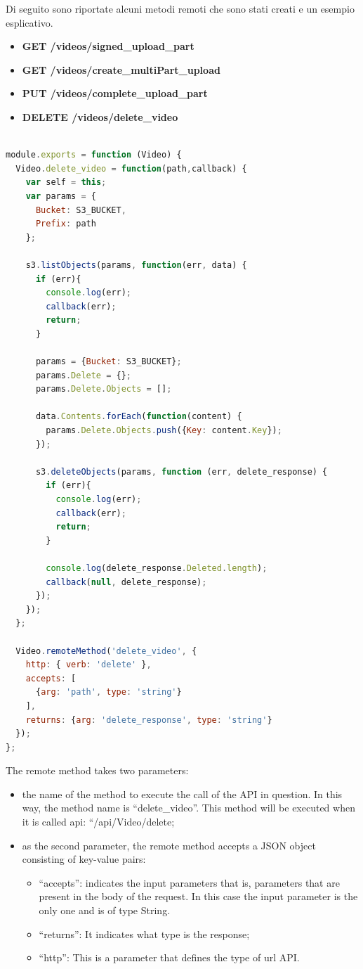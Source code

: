 Di seguito sono riportate alcuni metodi remoti che sono stati creati e un esempio esplicativo.

\begin{itemize}
\item \textbf{GET /videos/signed\_upload\_part }
\item \textbf{GET /videos/create\_multiPart\_upload}
\item \textbf{PUT /videos/complete\_upload\_part }
\item \textbf{DELETE /videos/delete\_video}
\end{itemize}

\begin{lstlisting}[language=javascript]

module.exports = function (Video) {
  Video.delete_video = function(path,callback) {
    var self = this;
    var params = {
      Bucket: S3_BUCKET,
      Prefix: path
    };

    s3.listObjects(params, function(err, data) {
      if (err){
        console.log(err);
        callback(err);
        return;
      } 

      params = {Bucket: S3_BUCKET};
      params.Delete = {};
      params.Delete.Objects = [];

      data.Contents.forEach(function(content) {
        params.Delete.Objects.push({Key: content.Key});
      });

      s3.deleteObjects(params, function (err, delete_response) {
        if (err){
          console.log(err);
          callback(err);
          return;
        }

        console.log(delete_response.Deleted.length);
        callback(null, delete_response);
      });
    });
  };

  Video.remoteMethod('delete_video', {
    http: { verb: 'delete' },
    accepts: [
      {arg: 'path', type: 'string'}
    ],
    returns: {arg: 'delete_response', type: 'string'}
  });
};
\end{lstlisting}

The remote method takes two parameters:
\begin{itemize}
\item the name of the method to execute the call of the API in question. In this way, the method name is “delete\_video”. This method will be executed when it is called api: “/api/Video/delete;
\item as the second parameter, the remote method accepts a JSON object consisting of key-value pairs:
  \begin{itemize}
    \item “accepts”: indicates the input parameters that is, parameters that are present in the body of the request. In this case the input parameter is the only one and is of type String.
    \item “returns”: It indicates what type is the response;
    \item “http”: This is a parameter that defines the type of url API.
  \end{itemize}
\end{itemize}


